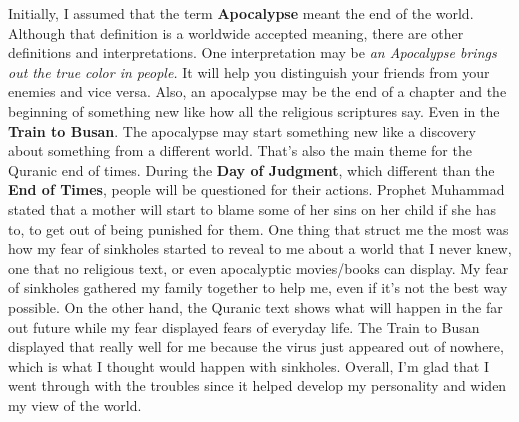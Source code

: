 \begin{essay}
  Initially, I assumed that the term \textbf{Apocalypse} meant the end of the
  world. Although that definition is a worldwide accepted meaning, there are
  other definitions and interpretations. One interpretation may be \textit{an
  Apocalypse brings out the true color in people.} It will help you distinguish
  your friends from your enemies and vice versa. Also, an apocalypse may be the
  end of a chapter and the beginning of something new like how all the religious
  scriptures say. Even in the \textbf{Train to Busan}. The apocalypse may start
  something new like a discovery about something from a different world. That's
  also the main theme for the Quranic end of times. During the \textbf{Day of
  Judgment}, which different than the \textbf{End of Times}, people will be
  questioned for their actions. Prophet Muhammad stated that a mother will start
  to blame some of her sins on her child if she has to, to get out of being
  punished for them. One thing that struct me the most was how my fear of
  sinkholes started to reveal to me about a world that I never knew, one that no
  religious text, or even apocalyptic movies/books can display. My fear of
  sinkholes gathered my family together to help me, even if it's not the best
  way possible. On the other hand, the Quranic text shows what will happen in
  the far out future while my fear displayed fears of everyday life. The Train
  to Busan displayed that really well for me because the virus just appeared out
  of nowhere, which is what I thought would happen with sinkholes. Overall, I'm
  glad that I went through with the troubles since it helped develop my
  personality and widen my view of the world.
\end{essay}
